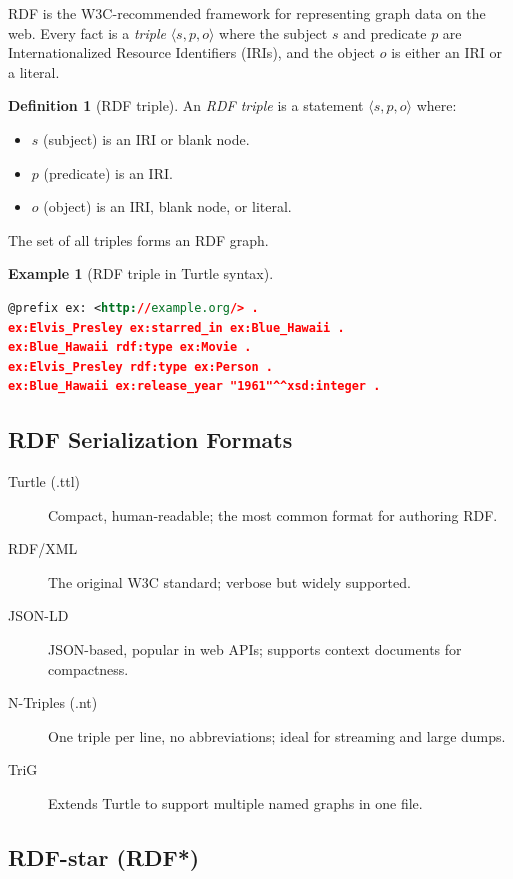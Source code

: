 \documentclass[11pt,a4paper,oneside,openany]{book}
\theoremstyle{definition}
\newtheorem{definition}{Definition}[chapter]
\newtheorem{example}{Example}[chapter]
\theoremstyle{plain}
\theoremstyle{remark}
\begin{document}
RDF is the W3C-recommended framework for representing graph data on the web. Every fact is a \emph{triple} $\langle s, p, o \rangle$ where the subject $s$ and predicate $p$ are Internationalized Resource Identifiers (IRIs), and the object $o$ is either an IRI or a literal.

\begin{definition}[RDF triple]
	An \emph{RDF triple} is a statement $\langle s, p, o \rangle$ where:
	\begin{itemize}
		\item $s$ (subject) is an IRI or blank node.
		\item $p$ (predicate) is an IRI.
		\item $o$ (object) is an IRI, blank node, or literal.
	\end{itemize}
	The set of all triples forms an RDF graph.
\end{definition}

\begin{example}[RDF triple in Turtle syntax]
	\label{ex:rdf-turtle}
	\begin{lstlisting}[language=XML,numbers=none]
@prefix ex: <http://example.org/> .
ex:Elvis_Presley ex:starred_in ex:Blue_Hawaii .
ex:Blue_Hawaii rdf:type ex:Movie .
ex:Elvis_Presley rdf:type ex:Person .
ex:Blue_Hawaii ex:release_year "1961"^^xsd:integer .
\end{lstlisting}
\end{example}

\subsection{RDF Serialization Formats}

\begin{description}
	\item[Turtle (.ttl)] Compact, human-readable; the most common format for authoring RDF.
	\item[RDF/XML] The original W3C standard; verbose but widely supported.
	\item[JSON-LD] JSON-based, popular in web APIs; supports context documents for compactness.
	\item[N-Triples (.nt)] One triple per line, no abbreviations; ideal for streaming and large dumps.
	\item[TriG] Extends Turtle to support multiple named graphs in one file.
\end{description}

\subsection{RDF-star (RDF*)}
\end{document}
